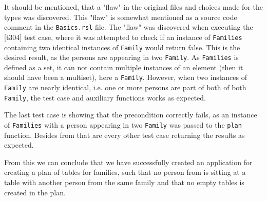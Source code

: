 \documentclass[a4]{article}
\begin{document}

It should be mentioned, that a "flaw" in the original files and choices made for the types was discovered. This "flaw" is somewhat mentioned as a source code comment in the \verb=Basics.rsl= file. The "flaw" was discovered when executing the {[}t304{]} test case, where it was attempted to check if an instance of \verb=Families= containing two identical instances of \verb=Family= would return false. This is the desired result, as the persons are appearing in two \verb=Family=. As \verb=Families= is defined as a set, it can not contain multiple instances of an element (then it should have been a multiset), here a \verb=Family=. However, when two instances of \verb=Family= are nearly identical, i.e. one or more persons are part of both of both \verb=Family=, the test case and auxiliary functions works as expected.

The last test case is showing that the precondition correctly fails, as an instance of \verb=Families= with a person appearing in two \verb=Family= was passed to the \verb=plan= function. Besides from that are every other test case returning the results as expected.

\noindent From this we can conclude that we have successfully created an application for creating a plan of tables for families, such that no person from is sitting at a table with another person from the same family and that no empty tables is created in the plan.
\end{document}
